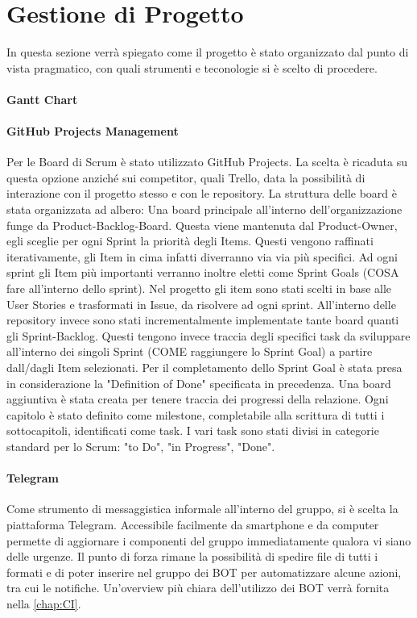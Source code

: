     
    
    

\section{Gestione di Progetto}
In questa sezione verrà spiegato come il progetto è stato organizzato dal punto di vista pragmatico, con quali strumenti e teconologie si è scelto di procedere.
    \paragraph{Gantt Chart}
    
    \paragraph{GitHub Projects Management}
    Per le Board di Scrum è stato utilizzato GitHub Projects. La scelta è ricaduta su questa opzione anziché sui competitor, quali Trello, data la possibilità di interazione con il progetto stesso e con le repository. 
    La struttura delle board è stata organizzata ad albero:
    Una board principale all'interno dell'organizzazione funge da Product-Backlog-Board. Questa viene mantenuta dal Product-Owner, egli sceglie per ogni Sprint la priorità degli Items. Questi vengono raffinati iterativamente, gli Item in cima infatti diverranno via via più specifici. Ad ogni sprint gli Item più importanti verranno inoltre eletti come Sprint Goals (COSA fare all'interno dello sprint). 
    Nel progetto gli item sono stati scelti in base alle User Stories e trasformati in Issue, da risolvere ad ogni sprint.
    All'interno delle repository invece sono stati incrementalmente implementate tante board quanti gli Sprint-Backlog. Questi tengono invece traccia degli specifici task da sviluppare all'interno dei singoli Sprint (COME raggiungere lo Sprint Goal) a partire dall/dagli Item selezionati. 
    Per il completamento dello Sprint Goal è stata presa in considerazione  la "Definition of Done" specificata in precedenza.
    Una board aggiuntiva è stata creata per tenere traccia dei progressi della relazione. Ogni capitolo è stato definito come milestone, completabile alla scrittura di tutti i sottocapitoli, identificati come task.
    I vari task sono stati divisi in categorie standard per lo Scrum: "to Do", "in Progress", "Done".
    
    \paragraph{Telegram}
    Come strumento di messaggistica informale all'interno del gruppo, si è scelta la piattaforma Telegram. Accessibile facilmente da smartphone e da computer permette di aggiornare i componenti del gruppo immediatamente qualora vi siano delle urgenze. Il punto di forza rimane la  possibilità di spedire file di tutti i formati e di poter inserire nel gruppo dei BOT per automatizzare alcune azioni, tra cui le notifiche. Un'overview più chiara dell'utilizzo dei BOT verrà fornita nella \autoref{chap:CI}.
    
